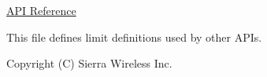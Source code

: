 \hyperlink{le__limit__interface_8h}{A\+PI Reference}

This file defines limit definitions used by other A\+P\+Is.





Copyright (C) Sierra Wireless Inc. 
